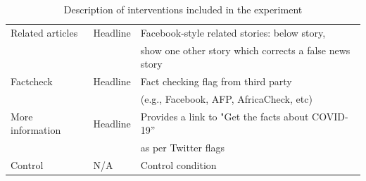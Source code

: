 \documentclass[letterpaper, 12pt, parskip=full,]{scrartcl}
\begin{document}
\begin{table}[H]
\begin{tabular}{l|l|l}
Related articles                                                                                                       & Headline                                                                                                     & Facebook-style related stories: below story,\\ & & show one other story which corrects a false news story                                                                                                                                                                                                                                                                                             \\
Factcheck                                                                                                      & Headline                                                                                                     & Fact checking flag from third party\\ & & (e.g., Facebook, AFP, AfricaCheck, etc)
 \\
More information                                                                                                      & Headline                                                                                                     & Provides a link to "Get the facts about COVID-19''\\ & & as per Twitter flags
 \\
Control                                                                                                        & N/A                                                                                                          & Control condition                                                                                                                                                                                                                                                                                                                                                                                              
\end{tabular}
\caption{Description of interventions included in the experiment}
\label{tab:treatments}
\end{table}
\end{document}

